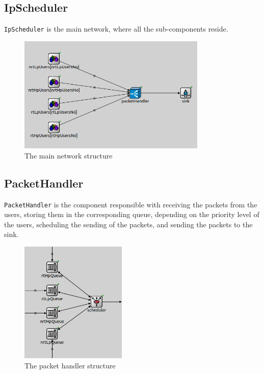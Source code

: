 \documentclass[12pt]{article}
\begin{document}
        \subsection{IpScheduler}
        \verb|IpScheduler| is the main network, where all the sub-components reside.
        \begin{figure}[htbp!]
            \centering
            \includegraphics[width=0.8\textwidth]{images/ip_scheduler.png}
            \caption{The main network structure}
        \end{figure}
        \pagebreak
        
        \subsection{PacketHandler}
        \verb|PacketHandler| is the component responsible with receiving the packets from the users, storing them in the corresponding queue, depending on the priority level of the users, scheduling the sending of the packets, and sending the packets to the sink.
        \begin{figure}[htbp!]
            \centering
            \includegraphics[width=0.45\textwidth]{images/packet_handler.png}
            \caption{The packet handler structure}
        \end{figure}
        
\end{document}
